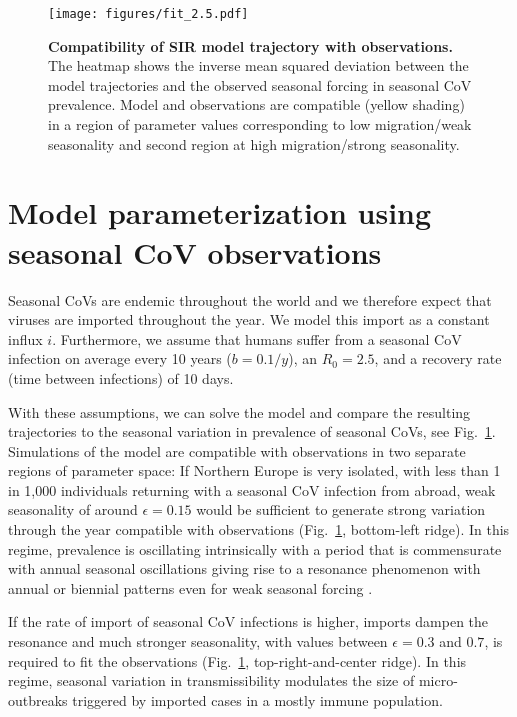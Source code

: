 \documentclass[rmp, reprint, superscriptaddress, floatfix,amsmath]{revtex4-1}
\begin{document}
\begin{figure}
    \centering
    \texttt{[image: figures/fit\_2.5.pdf]}
    \caption{{\bf Compatibility of SIR model trajectory with observations.} The heatmap shows the inverse mean squared deviation between the model trajectories and the observed seasonal forcing in seasonal CoV prevalence. Model and observations are compatible (yellow shading) in a region of parameter values corresponding to low migration/weak seasonality and second region at high migration/strong seasonality. }
    \label{fig:parameter_seasonal}
\end{figure}

\section{Model parameterization using seasonal CoV observations}
Seasonal CoVs are endemic throughout the world and we therefore expect that viruses are imported throughout the year. 
We model this import as a constant influx $i$. 
Furthermore, we assume that humans suffer from a seasonal CoV infection on average every 10 years ($b=0.1/y$), an $R_0=2.5$, and a recovery rate (time between infections) of 10 days.

With these assumptions, we can solve the model and compare the resulting trajectories to the seasonal variation in prevalence of seasonal CoVs, see Fig.~\ref{fig:parameter_seasonal}.
Simulations of the model are compatible with observations in two separate regions of parameter space: If Northern Europe is very isolated, with less than 1 in 1,000 individuals returning with a seasonal CoV infection from abroad, weak seasonality of around $\epsilon=0.15$ would be sufficient to generate strong variation through the year compatible with observations (Fig.~\ref{fig:parameter_seasonal}, bottom-left ridge).
In this regime, prevalence is oscillating intrinsically with a period that is commensurate with annual seasonal oscillations giving rise to a resonance phenomenon with annual or biennial patterns even for weak seasonal forcing \citep{dushoff_dynamical_2004,chen_regular_2017}.

If the rate of import of seasonal CoV infections is higher, imports dampen the resonance and much stronger seasonality, with values between $\epsilon=0.3$ and $0.7$, is required to fit the observations (Fig.~\ref{fig:parameter_seasonal}, top-right-and-center ridge).
In this regime, seasonal variation in transmissibility modulates the size of micro-outbreaks triggered by imported cases in a mostly immune population. 
\end{document}
